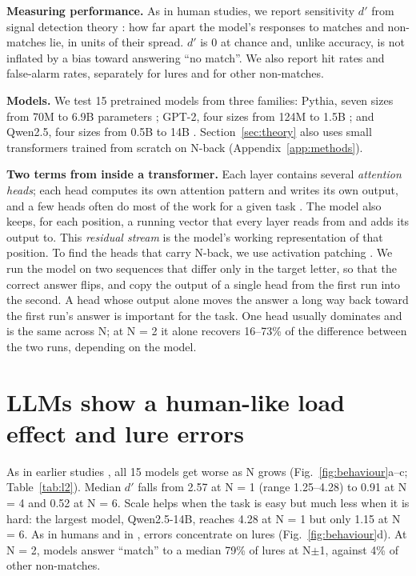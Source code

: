 \documentclass{article}
\newcommand{\dprime}{$d'$}
\begin{document}
\textbf{Measuring performance.} As in human studies, we report sensitivity \dprime{} from signal detection theory \citep{hautus1995corrections}: how far apart the model's responses to matches and non-matches lie, in units of their spread. \dprime{} is 0 at chance and, unlike accuracy, is not inflated by a bias toward answering ``no match''. We also report hit rates and false-alarm rates, separately for lures and for other non-matches.

\textbf{Models.} We test 15 pretrained models from three families: Pythia, seven sizes from 70M to 6.9B parameters \citep{biderman2023pythia}; GPT-2, four sizes from 124M to 1.5B \citep{radford2019gpt2}; and Qwen2.5, four sizes from 0.5B to 14B \citep{qwen2025qwen25}. Section~\ref{sec:theory} also uses small transformers trained from scratch on N-back (Appendix~\ref{app:methods}).

\textbf{Two terms from inside a transformer.} Each layer contains several \emph{attention heads}; each head computes its own attention pattern and writes its own output, and a few heads often do most of the work for a given task \citep{elhage2021framework,olsson2022induction,wu2024retrieval}. The model also keeps, for each position, a running vector that every layer reads from and adds its output to. This \emph{residual stream} is the model's working representation of that position. To find the heads that carry N-back, we use activation patching \citep{zhang2024patching}. We run the model on two sequences that differ only in the target letter, so that the correct answer flips, and copy the output of a single head from the first run into the second. A head whose output alone moves the answer a long way back toward the first run's answer is important for the task. One head usually dominates and is the same across N; at N = 2 it alone recovers 16--73\% of the difference between the two runs, depending on the model.

\section{LLMs show a human-like load effect and lure errors}
\label{sec:behaviour}

As in earlier studies \citep{gong2024chatgpt,hu2025nback,xiong2026superposition}, all 15 models get worse as N grows (Fig.~\ref{fig:behaviour}a--c; Table~\ref{tab:l2}). Median \dprime{} falls from 2.57 at N = 1 (range 1.25--4.28) to 0.91 at N = 4 and 0.52 at N = 6. Scale helps when the task is easy but much less when it is hard: the largest model, Qwen2.5-14B, reaches 4.28 at N = 1 but only 1.15 at N = 6. As in humans and in \citet{xiong2026superposition}, errors concentrate on lures (Fig.~\ref{fig:behaviour}d). At N = 2, models answer ``match'' to a median 79\% of lures at N$\pm$1, against 4\% of other non-matches.
\end{document}
